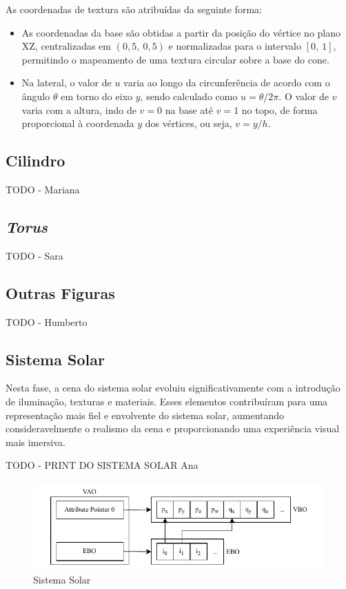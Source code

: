 \documentclass[12pt, a4paper]{article}
\begin{document}
As coordenadas de textura são atribuídas da seguinte forma:

\begin{itemize}
    \item As coordenadas da base são obtidas a partir da posição do vértice no plano XZ,
    centralizadas em $(0{,}5,\ 0{,}5)$ e normalizadas para o intervalo $[0,\ 1]$,
    permitindo o mapeamento de uma textura circular sobre a base do cone.
    \item Na lateral, o valor de $u$ varia ao longo da circunferência de acordo com o ângulo
    $\theta$ em torno do eixo $y$, sendo calculado como $u = \theta / 2\pi$. O valor de $v$
    varia com a altura, indo de $v = 0$ na base até $v = 1$ no topo, de forma proporcional à
    coordenada $y$ dos vértices, ou seja, $v = y/h$.
\end{itemize}

\subsection{Cilindro}

{\color{red} TODO - Mariana}

\subsection{\emph{Torus}}

{\color{red} TODO - Sara}

\subsection{Outras Figuras}

{\color{red} TODO - Humberto}

\subsection{Sistema Solar}

Nesta fase, a cena do sistema solar evoluiu significativamente com a introdução de iluminação,
texturas e materiais. Esses elementos contribuíram para uma representação mais fiel e
envolvente do sistema solar, aumentando consideravelmente o realismo da cena e proporcionando
uma experiência visual mais imersiva.

{\color{red} TODO - PRINT DO SISTEMA SOLAR Ana}

\begin{figure}[H]
    \centering
    \includegraphics[width=\textwidth]{res/phase3/VAO.pdf}
    \caption{Sistema Solar}
\end{figure}
\end{document}
